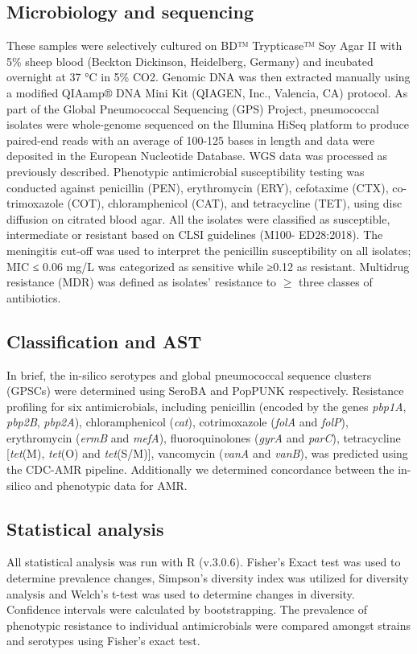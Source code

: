 \documentclass{article}
\begin{document}
\subsection{Microbiology and sequencing}
These samples were selectively cultured on BD™ Trypticase™ Soy Agar II with 5\% sheep blood (Beckton Dickinson, Heidelberg, Germany) and incubated overnight at 37 °C in 5\% CO2. Genomic DNA was then extracted manually using a modified QIAamp® DNA Mini Kit (QIAGEN, Inc., Valencia, CA) protocol. As part of the Global Pneumococcal Sequencing (GPS) Project, pneumococcal isolates were whole-genome sequenced on the Illumina HiSeq platform to produce paired-end reads with an average of 100-125 bases in length and data were deposited in the European Nucleotide Database. WGS data was processed as previously described\cite{gladstoneInternationalGenomicDefinition2019b}. Phenotypic antimicrobial susceptibility testing was conducted against penicillin (PEN), erythromycin (ERY), cefotaxime (CTX), co-trimoxazole (COT), chloramphenicol (CAT), and tetracycline (TET), using disc diffusion on citrated blood agar. All the isolates were classified as susceptible, intermediate or resistant based on CLSI guidelines (M100- ED28:2018). The meningitis cut-off was used to interpret the penicillin susceptibility on all isolates; MIC ≤ 0.06 mg/L was categorized as sensitive while ≥0.12 as resistant. Multidrug resistance (MDR) was defined as isolates’ resistance to $≥$ three classes of antibiotics.
\subsection{Classification and AST}
In brief, the in-silico serotypes and global pneumococcal sequence clusters (GPSCs) were determined using SeroBA \cite{eppingSeroBARapidHighthroughput2018} and PopPUNK \cite{leesFastFlexibleBacterial2019} respectively. Resistance profiling for six antimicrobials, including penicillin (encoded by the genes \textit{pbp1A}, \textit{pbp2B}, \textit{pbp2A}), chloramphenicol (\textit{cat}), cotrimoxazole (\textit{folA} and \textit{folP}), erythromycin (\textit{ermB} and \textit{mefA}), fluoroquinolones (\textit{gyrA} and \textit{parC}), tetracycline [\textit{tet}(M), \textit{tet}(O) and \textit{tet}(S/M)], vancomycin (\textit{vanA} and \textit{vanB}), was predicted using the CDC-AMR pipeline\cite{benjamesmetcalfBenJamesMetcalfSangerSPN2016}. Additionally we determined concordance between the in-silico and phenotypic data for AMR. 
\subsection{Statistical analysis}
All statistical analysis was run with R (v.3.0.6). Fisher’s Exact test was used to determine prevalence changes, Simpson’s diversity index was utilized for diversity analysis \cite{simpsonMeasurementDiversity1949} and Welch's t-test was used to determine changes in diversity. Confidence intervals were calculated by bootstrapping. The prevalence of phenotypic resistance to individual antimicrobials were compared amongst strains and serotypes using Fisher’s exact test.
\end{document}
